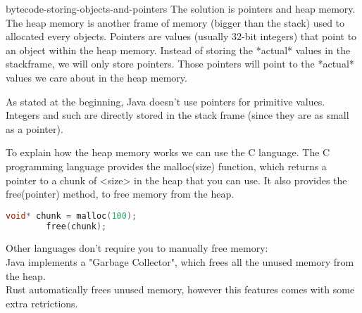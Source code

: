 \documentclass[preview]{standalone}
\begin{document}
\begin{snippet}{bytecode-storing-objects-and-pointers}
    The solution is pointers and heap memory.
    The heap memory is another frame of memory (bigger than the stack) used to allocated every objects.
    Pointers are values (usually 32-bit integers) that point to an object within the heap memory.
    Instead of storing the *actual* values in the stackframe, we will only store pointers.
    Those pointers will point to the *actual* values we care about in the heap memory.
    
    As stated at the beginning, Java doesn't use pointers for primitive values. Integers and such
    are directly stored in the stack frame (since they are as small as a pointer).
    
    To explain how the heap memory works we can use the C language.
    The C programming language provides the malloc(size) function, which returns a pointer to a chunk of <size> in the heap that you can use.
    It also provides the free(pointer) method, to free memory from the heap.
    
    \begin{lstlisting}[language=C]
        void* chunk = malloc(100);
        free(chunk);
    \end{lstlisting}
    
    Other languages don't require you to manually free memory: \\
    Java implements a "Garbage Collector", which frees all the unused memory from the heap. \\
    Rust automatically frees unused memory, however this features comes with some extra retrictions.
\end{snippet}
\end{document}
